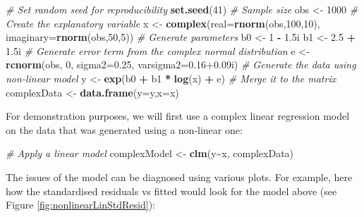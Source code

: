 \documentclass[
]{book}
\newenvironment{Shaded}{\begin{snugshade}}{\end{snugshade}}
\newcommand{\CommentTok}[1]{\textcolor[rgb]{0.56,0.35,0.01}{\textit{#1}}}
\newcommand{\DataTypeTok}[1]{\textcolor[rgb]{0.13,0.29,0.53}{#1}}
\newcommand{\DecValTok}[1]{\textcolor[rgb]{0.00,0.00,0.81}{#1}}
\newcommand{\FloatTok}[1]{\textcolor[rgb]{0.00,0.00,0.81}{#1}}
\newcommand{\KeywordTok}[1]{\textcolor[rgb]{0.13,0.29,0.53}{\textbf{#1}}}
\newcommand{\NormalTok}[1]{#1}
\newcommand{\OperatorTok}[1]{\textcolor[rgb]{0.81,0.36,0.00}{\textbf{#1}}}
\newcommand{\StringTok}[1]{\textcolor[rgb]{0.31,0.60,0.02}{#1}}
\begin{document}
\begin{Shaded}
\begin{Highlighting}[]
\CommentTok{\# Set random seed for reproducibility}
\KeywordTok{set.seed}\NormalTok{(}\DecValTok{41}\NormalTok{)}
\CommentTok{\# Sample size}
\NormalTok{obs \textless{}{-}}\StringTok{ }\DecValTok{1000}
\CommentTok{\# Create the explanatory variable}
\NormalTok{x \textless{}{-}}\StringTok{ }\KeywordTok{complex}\NormalTok{(}\DataTypeTok{real=}\KeywordTok{rnorm}\NormalTok{(obs,}\DecValTok{100}\NormalTok{,}\DecValTok{10}\NormalTok{), }\DataTypeTok{imaginary=}\KeywordTok{rnorm}\NormalTok{(obs,}\DecValTok{50}\NormalTok{,}\DecValTok{5}\NormalTok{))}
\CommentTok{\# Generate parameters}
\NormalTok{b0 \textless{}{-}}\StringTok{ }\DecValTok{1} \OperatorTok{{-}}\StringTok{ }\FloatTok{1.5}\NormalTok{i}
\NormalTok{b1 \textless{}{-}}\StringTok{ }\FloatTok{2.5} \OperatorTok{+}\StringTok{ }\FloatTok{1.5}\NormalTok{i}
\CommentTok{\# Generate error term from the complex normal distribution}
\NormalTok{e \textless{}{-}}\StringTok{ }\KeywordTok{rcnorm}\NormalTok{(obs, }\DecValTok{0}\NormalTok{, }\DataTypeTok{sigma2=}\FloatTok{0.25}\NormalTok{, }\DataTypeTok{varsigma2=}\FloatTok{0.16+0.09}\NormalTok{i)}
\CommentTok{\# Generate the data using non{-}linear model}
\NormalTok{y \textless{}{-}}\StringTok{ }\KeywordTok{exp}\NormalTok{(b0 }\OperatorTok{+}\StringTok{ }\NormalTok{b1 }\OperatorTok{*}\StringTok{ }\KeywordTok{log}\NormalTok{(x) }\OperatorTok{+}\StringTok{ }\NormalTok{e)}
\CommentTok{\# Merge it to the matrix}
\NormalTok{complexData \textless{}{-}}\StringTok{ }\KeywordTok{data.frame}\NormalTok{(}\DataTypeTok{y=}\NormalTok{y,}\DataTypeTok{x=}\NormalTok{x)}
\end{Highlighting}
\end{Shaded}

For demonstration purposes, we will first use a complex linear regression model on the data that was generated using a non-linear one:

\begin{Shaded}
\begin{Highlighting}[]
\CommentTok{\# Apply a linear model}
\NormalTok{complexModel \textless{}{-}}\StringTok{ }\KeywordTok{clm}\NormalTok{(y}\OperatorTok{\textasciitilde{}}\NormalTok{x, complexData)}
\end{Highlighting}
\end{Shaded}

The issues of the model can be diagnosed using various plots. For example, here how the standardised residuals vs fitted would look for the model above (see Figure \ref{fig:nonlinearLinStdResid}):
\end{document}
